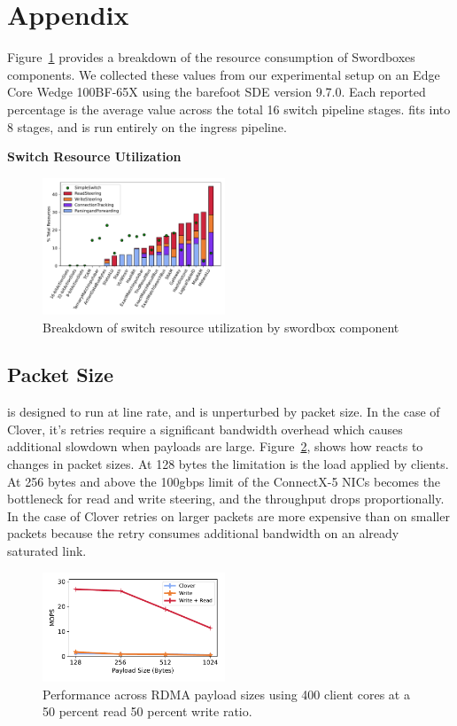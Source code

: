 \section{Appendix}

Figure~\ref{fig:switch_resources} provides a breakdown of the resource
consumption of Swordboxes components. We collected these values from our
experimental setup on an Edge Core Wedge 100BF-65X using the barefoot SDE
version 9.7.0. Each reported percentage is the average value across the total 16
switch pipeline stages. {\sword} fits into 8 stages, and is run entirely on the
ingress pipeline.

\textbf{Switch Resource Utilization}
\begin{figure}[t]
    \includegraphics[width=0.485\textwidth]{fig/switch_resources.pdf}
    \caption{Breakdown of switch resource utilization by swordbox component}
    \label{fig:switch_resources}
\end{figure}

\subsection{Packet Size}

{\sword} is designed to run at line rate, and is unperturbed by packet size. In
the case of Clover, it's retries require a significant bandwidth overhead which
causes additional slowdown when payloads are large.
Figure~\ref{fig:packet_size}, shows how {\sword} reacts to changes in packet
sizes. At 128 bytes the limitation is the load applied by clients. At 256 bytes
and above the 100gbps limit of the ConnectX-5 NICs becomes the bottleneck for
read and write steering, and the throughput drops proportionally. In the case of
Clover retries on larger packets are more expensive than on smaller packets
because the retry consumes additional bandwidth on an already saturated link.

\begin{figure}
  \centering
  \includegraphics[width=0.485\textwidth]{fig/packet_size.pdf}

    \caption{Performance across RDMA payload sizes using 400 client cores at a
    50 percent read 50 percent write ratio.}

    \label{fig:packet_size}
\end{figure}

